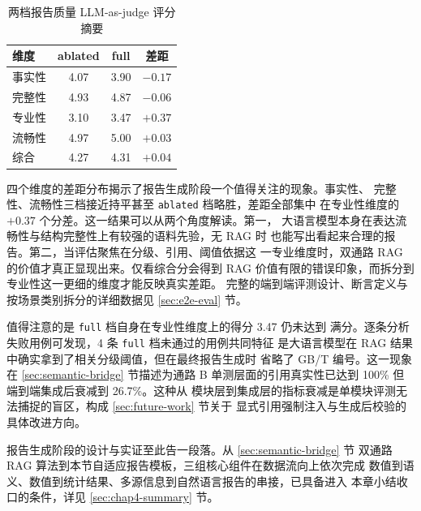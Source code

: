 \documentclass[a4paper]{article}
\newcommand{\song}{\CJKfamily{song}}
\newcommand{\wuhao}{\fontsize{10.5pt}{18pt}\selectfont}
\theoremstyle{definition}
\theoremstyle{plain}
\theoremstyle{remark}
\begin{document}
\begin{table}[!ht]
    \centering
    \caption{两档报告质量 LLM-as-judge 评分摘要}
    \label{tab:report-judge-summary}
    \song\wuhao
    \begin{tabular}{lccc}
        \toprule
        维度 & ablated & full & 差距 \\
        \midrule
        事实性 & 4.07 & 3.90 & $-0.17$ \\
        完整性 & 4.93 & 4.87 & $-0.06$ \\
        专业性 & 3.10 & 3.47 & $+0.37$ \\
        流畅性 & 4.97 & 5.00 & $+0.03$ \\
        综合 & 4.27 & 4.31 & $+0.04$ \\
        \bottomrule
    \end{tabular}
\end{table}

四个维度的差距分布揭示了报告生成阶段一个值得关注的现象。事实性、
完整性、流畅性三档接近持平甚至 \texttt{ablated} 档略胜，差距全部集中
在专业性维度的 $+0.37$ 个分差。这一结果可以从两个角度解读。第一，
大语言模型本身在表达流畅性与结构完整性上有较强的语料先验，无 RAG 时
也能写出看起来合理的报告。第二，当评估聚焦在分级、引用、阈值依据这
一专业维度时，双通路 RAG 的价值才真正显现出来。仅看综合分会得到 RAG
价值有限的错误印象，而拆分到专业性这一更细的维度才能反映真实差距。
完整的端到端评测设计、断言定义与按场景类别拆分的详细数据见
\ref{sec:e2e-eval} 节。

值得注意的是 \texttt{full} 档自身在专业性维度上的得分 3.47 仍未达到
满分。逐条分析失败用例可发现，4 条 \texttt{full} 档未通过的用例共同特征
是大语言模型在 RAG 结果中确实拿到了相关分级阈值，但在最终报告生成时
省略了 GB/T 编号。这一现象在 \ref{sec:semantic-bridge} 节描述为通路 B
单测层面的引用真实性已达到 100\% 但端到端集成后衰减到 26.7\%。这种从
模块层到集成层的指标衰减是单模块评测无法捕捉的盲区，构成
\ref{sec:future-work} 节关于
显式引用强制注入与生成后校验的具体改进方向。

报告生成阶段的设计与实证至此告一段落。从 \ref{sec:semantic-bridge} 节
双通路 RAG 算法到本节自适应报告模板，三组核心组件在数据流向上依次完成
数值到语义、数值到统计结果、多源信息到自然语言报告的串接，已具备进入
本章小结收口的条件，详见 \ref{sec:chap4-summary} 节。

\end{document}
